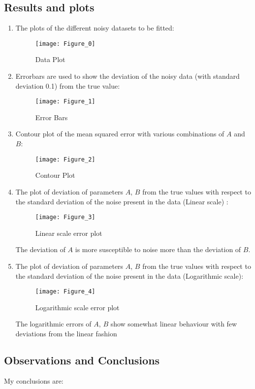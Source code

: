 \documentclass[12pt, a4paper]{report}
\begin{document}
\subsection*{Results and plots}
\begin{enumerate}
\item The plots of the different noisy datasets to be fitted:
\begin{figure}[H]
    \centering
	\texttt{[image: Figure\_0]} 
	\caption{Data Plot}
	\label{fig:rawdata}
\end{figure}
\clearpage

\item Errorbars are used to show the deviation of the noisy data (with standard deviation 0.1) from the true value:
\begin{figure}[H]
    \centering
	\texttt{[image: Figure\_1]}
	\caption{Error Bars}
	\label{fig:errobars}
\end{figure}

\item Contour plot of the mean squared error with various combinations of $A$ and $B$:
\begin{figure}[H]
    \centering
	\texttt{[image: Figure\_2]}
	\caption{Contour Plot}
	\label{fig:contour}
\end{figure}

\clearpage
\item The plot of deviation of parameters $A$, $B$ from the true values with respect to the standard deviation of the noise present in the data (Linear scale) :
\begin{figure}[H]
    \centering
	\texttt{[image: Figure\_3]}
	\caption{Linear scale error plot}
	\label{fig:eplot}
\end{figure}
The deviation of $A$ is more susceptible to noise more than the deviation of $B$. 

\item The plot of deviation of parameters $A$, $B$ from the true values with respect to the standard deviation of the noise present in the data (Logarithmic scale):
\begin{figure}[H]
    \centering
	\texttt{[image: Figure\_4]}
	\caption{Logarithmic scale error plot}
	\label{fig:logplota}
\end{figure}
The logarithmic errors of $A$, $B$ show somewhat linear behaviour with few deviations from the linear fashion
\end{enumerate}

\subsection*{Observations and Conclusions}
My conclusions are:
\end{document}
